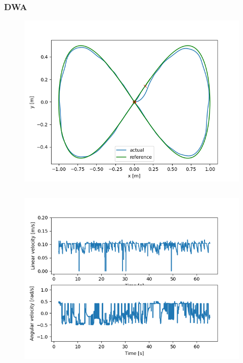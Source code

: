 \documentclass{beamer}
\begin{document}
\begin{frame}[allowframebreaks]
\frametitle{DWA}

\vspace{-2em}

\begin{figure}[H]
    \centering
    \includegraphics[scale=0.6]{img/dwa_screenshots/Trajectory.png}
\end{figure}

\framebreak

\begin{columns}


\vspace{-2em}

\begin{figure}[H]
    \centering
    \includegraphics[scale=0.3]{img/dwa_screenshots/Linear_and_Angular_Velocities.png}
\end{figure}


\end{columns}
\end{frame}
\end{document}
